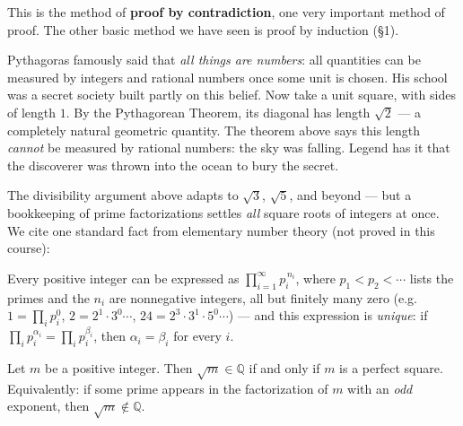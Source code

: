 \documentclass[11pt]{report}
\begin{document}
\begin{rembox}
This is the method of \textbf{proof by contradiction}, one very important method of proof. The other basic method we have seen is proof by induction (\S 1).
\end{rembox}

\begin{rembox}
Pythagoras famously said that \emph{all things are numbers}: all quantities can be measured by integers and rational numbers once some unit is chosen. His school was a secret society built partly on this belief. Now take a unit square, with sides of length $1$. By the Pythagorean Theorem, its diagonal has length $\sqrt{2}$ --- a completely natural geometric quantity. The theorem above says this length \emph{cannot} be measured by rational numbers: the sky was falling. Legend has it that the discoverer was thrown into the ocean to bury the secret.
\end{rembox}

The divisibility argument above adapts to $\sqrt3$, $\sqrt5$, and beyond --- but a bookkeeping of prime factorizations settles \emph{all} square roots of integers at once. We cite one standard fact from elementary number theory (not proved in this course):

\begin{rembox}
Every positive integer can be expressed as $\prod_{i=1}^{\infty} p_i^{\,n_i}$, where $p_1 < p_2 < \cdots$ lists the primes and the $n_i$ are nonnegative integers, all but finitely many zero (e.g.\ $1 = \prod_i p_i^0$, $2 = 2^1\cdot3^0\cdots$, $24 = 2^3\cdot3^1\cdot5^0\cdots$) --- and this expression is \emph{unique}: if $\prod_i p_i^{\alpha_i} = \prod_i p_i^{\beta_i}$, then $\alpha_i = \beta_i$ for every $i$.
\end{rembox}

\begin{propbox}
Let $m$ be a positive integer. Then $\sqrt m \in \mathbb{Q}$ if and only if $m$ is a perfect square. Equivalently: if some prime appears in the factorization of $m$ with an \emph{odd} exponent, then $\sqrt m \notin \mathbb{Q}$.
\end{propbox}
\end{document}
